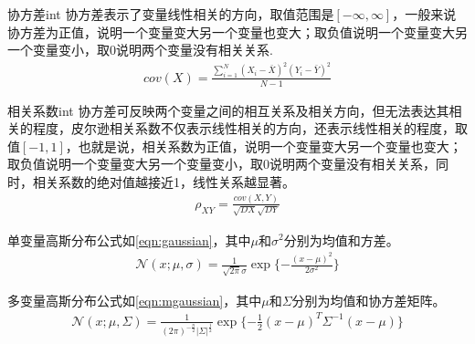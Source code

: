 \begin{definition}{协方差}{int}
协方差表示了变量线性相关的方向，取值范围是$[-\infty, \infty]$，一般来说协方差为正值，说明一个变量变大另一个变量也变大；取负值说明一个变量变大另一个变量变小，取0说明两个变量没有相关关系.
\begin{align}
cov(X) = \frac{\sum_{i=1}^{N}(X_i-\bar{X})^{2}(Y_i-\bar{Y})^{2}}{N-1}
\end{align}
\end{definition}

\begin{definition}{相关系数}{int}
协方差可反映两个变量之间的相互关系及相关方向，但无法表达其相关的程度，皮尔逊相关系数不仅表示线性相关的方向，还表示线性相关的程度，取值$[-1,1]$，也就是说，相关系数为正值，说明一个变量变大另一个变量也变大；取负值说明一个变量变大另一个变量变小，取0说明两个变量没有相关关系，同时，相关系数的绝对值越接近1，线性关系越显著。
\begin{align}
\rho_{XY} = \frac{cov(X, Y)}{\sqrt{DX}\sqrt{DY}}
\end{align}
\end{definition}

\begin{definition}{协方差矩阵}{int}
 当$X\in{R^{n}$为高维数据时，协方差矩阵可以很好的反映数据的性质，在协方差矩阵中，对角线元素反映了数据在各个维度上的离散程度，协方差矩阵为对角阵，非对角线元素反映了数据各个维度的相关性，其形式如下:
\begin{align}
\Sigma = 
\begin{bmatrix}
cov(x_1, x_1) & cov(x_1, x_2) & \cdots & cov(x_1, x_n) \\
cov(x_2, x_1) & cov(x_2, x_2) & \cdots & cov(x_2, x_n) \\
\vdots        & \vdots        & \ddots    & \vdots \\
cov(x_n, x_1) & cov(x_n, x_2) & \cdots & cov(x_n, x_n) 
\end{bmatrix}
\end{align}
\end{definition}

单变量高斯分布公式如\ref{eqn:gaussian}，其中$\mu$和$\sigma^{2}$分别为均值和方差。
\begin{align}
\label{eqn:gaussian}
\mathcal{N}(x; \mu, \sigma) = \frac{1}{\sqrt{2\pi}\sigma}\exp{\{-\frac{(x-\mu)^{2}}{2\sigma^{2}}\}}
\end{align}

多变量高斯分布公式如\ref{eqn:mgaussian}，其中$\mu$和$\Sigma$分别为均值和协方差矩阵。
\begin{align}
\label{eqn:mgaussian}
\mathcal{N}(x; \mu, \Sigma) = \frac{1}{(2\pi)^{-\frac{n}{2}}|\Sigma|^{\frac{1}{2}}}\exp{\{-\frac{1}{2}(x-\mu)^{T}\Sigma^{-1}(x-\mu)\}}
\end{align}

